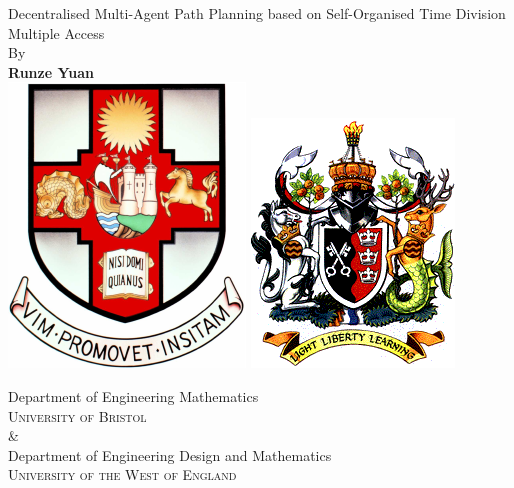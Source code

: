 \begin{titlepage}
    \begin{center}
        \vspace*{1cm}
        {\huge
        Decentralised Multi-Agent Path Planning based on Self-Organised Time Division Multiple Access}
        \vspace{0.5cm}
        \\
        {\large By}
        \\
        \vspace{0.5cm}
        \textbf{Runze Yuan}
   		\vspace{1.5cm}
        \\
        \vspace{0.25cm}
       \includegraphics[scale=0.6]{logos/bristolcrest_colour.pdf}
        \hspace{5mm}
        \includegraphics[scale=0.35]{logos/UWE_insignia.png}

        \vspace{10mm}
        {\large Department of Engineering Mathematics\\
        \textsc{University of Bristol}}
        \\
        \&
        \\
        {\large Department of Engineering Design and Mathematics\\
        \textsc{University of the West of England}}\\


\end{center}
\end{titlepage}
